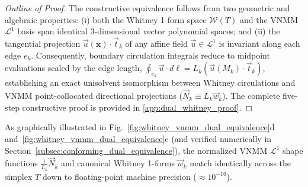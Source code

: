 \documentclass[preprint,12pt]{elsarticle}
\begin{document}
\begin{proof}[Outline of Proof]
    The constructive equivalence follows from two geometric and algebraic properties: (i) both the Whitney 1-form space $\mathcal{W}(T)$ and the VNMM $\mathcal{L}^1$ basis span identical 3-dimensional vector polynomial spaces; and (ii) the tangential projection $\vec{u}(\mathbf{x}) \cdot \vec{t}_k$ of any affine field $\vec{u} \in \mathcal{L}^1$ is invariant along each edge $e_k$. Consequently, boundary circulation integrals reduce to midpoint evaluations scaled by the edge length, $\oint_{e_k} \vec{u} \cdot d\boldsymbol{\ell} = L_k (\vec{u}(M_k) \cdot \vec{t}_k)$, establishing an exact unisolvent isomorphism between Whitney circulations and VNMM point-collocated directional projections ($\vec{N}_k \equiv L_k \vec{w}_k$). The complete five-step constructive proof is provided in \ref{app:dual_whitney_proof}.
\end{proof}

As graphically illustrated in Fig.~\ref{fig:whitney_vnmm_dual_equivalence}d and~\ref{fig:whitney_vnmm_dual_equivalence}e (and verified numerically in Section~\ref{subsec:conforming_dual_equivalence}), the normalized VNMM $\mathcal{L}^1$ shape functions $\frac{1}{L_k}\vec{N}_k$ and canonical Whitney 1-forms $\vec{w}_k$ match identically across the simplex $T$ down to floating-point machine precision ($\approx 10^{-16}$).
\end{document}
